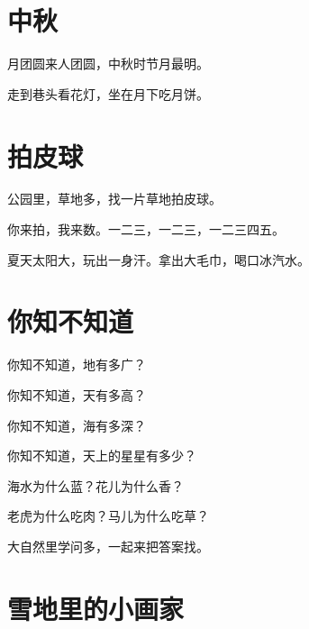 \documentclass[12pt,UTF-8,openany]{ctexbook}
\begin{document}
\chapter{中秋}

\begin{large}
    
    月团圆来人团圆，中秋时节月最明。
    
    走到巷头看花灯，坐在月下吃月饼。
    
\end{large}





\chapter{拍皮球}

\begin{large}
    
    公园里，草地多，找一片草地拍皮球。
    
    你来拍，我来数。一二三，一二三，一二三四五。
    
    夏天太阳大，玩出一身汗。拿出大毛巾，喝口冰汽水。
    
\end{large}





\chapter{你知不知道}

\begin{large}
    
    你知不知道，地有多广？
    
    你知不知道，天有多高？
    
    你知不知道，海有多深？
    
    你知不知道，天上的星星有多少？
    
    海水为什么蓝？花儿为什么香？
    
    老虎为什么吃肉？马儿为什么吃草？
    
    大自然里学问多，一起来把答案找。
    
\end{large}





\chapter{雪地里的小画家}
\end{document}
